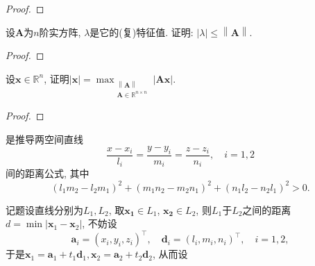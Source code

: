 \begin{quiza}
\begin{proof}
\end{proof}
\woe 设\(\boldsymbol{A}\)为\(n\)阶实方阵, \(\lambda\)是它的(复)特征值. 证明: \(|\lambda|\leqslant\left\|\boldsymbol{A}\right\|\).
\begin{proof}

\end{proof}
\woe 设\(\boldsymbol{x}\in\mathbb{R}^n\), 证明\(|\boldsymbol{x}|=\max_{\substack{\left\|\boldsymbol{A}\right\|\\\boldsymbol{A}\in\mathbb{R}^{n\times n}}}|\boldsymbol{Ax}|.\)
\begin{proof}

\end{proof}
\woe 是推导两空间直线\[\frac{x-x_i}{l_i}=\frac{y-y_i}{m_i}=\frac{z-z_i}{n_i},\quad i=1,2\]间的距离公式, 其中\[(l_1m_2-l_2m_1)^2+(m_1n_2-m_2n_1)^2+(n_1l_2-n_2l_1)^2>0.\]
\begin{solution}
记题设直线分别为\(L_1,L_2\), 取\(\boldsymbol{x_1}\in L_1\), \(\boldsymbol{x_2}\in L_2\), 则\(L_1\)于\(L_2\)之间的距离\(d = \min\left|\boldsymbol{x}_1-\boldsymbol{x}_2\right|\), 不妨设\[\boldsymbol{a}_i=\left(x_i,y_i,z_i\right)^\top,\quad \boldsymbol{d}_i=\left(l_i,m_i,n_i\right)^\top,\quad i=1,2,\]于是\(\boldsymbol{x}_1=\boldsymbol{a}_1+t_1\boldsymbol{d}_1,\boldsymbol{x}_2=\boldsymbol{a}_2+t_2\boldsymbol{d}_2\), 从而设\[\begin{split}

\end{split}\]
\end{solution}
\end{quiza}
